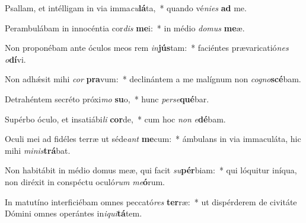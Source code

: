 \item Psallam, et intélligam in via imma\textit{cu}\textbf{lá}ta,~* quando vé\textit{ni}\textit{es} \textbf{ad} me.
\item Perambulábam in innocéntia cor\textit{dis} \textbf{me}i:~* in médio \textit{do}\textit{mus} \textbf{me}æ.
\item Non proponébam ante óculos meos rem \textit{in}\textbf{jús}tam:~* faciéntes prævaricatió\textit{nes} \textit{o}\textbf{dí}vi.
\item Non adhǽsit mihi \textit{cor} \textbf{pra}vum:~* declinántem a me malígnum non \textit{co}\textit{gno}\textbf{scé}bam.
\item Detrahéntem secréto próxi\textit{mo} \textbf{su}o,~* hunc \textit{per}\textit{se}\textbf{qué}bar.
\item Supérbo óculo, et insatiábi\textit{li} \textbf{cor}de,~* cum hoc \textit{non} \textit{e}\textbf{dé}bam.
\item Oculi mei ad fidéles terræ ut séde\textit{ant} \textbf{me}cum:~* ámbulans in via immaculáta, hic mihi \textit{mi}\textit{nis}\textbf{trá}bat.
\item Non habitábit in médio domus meæ, qui facit \textit{su}\textbf{pér}biam:~* qui lóquitur iníqua, non diréxit in conspéctu oculó\textit{rum} \textit{me}\textbf{ó}rum.
\item In matutíno interficiébam omnes peccató\textit{res} \textbf{ter}ræ:~* ut dispérderem de civitáte Dómini omnes operántes in\textit{i}\textit{qui}\textbf{tá}tem.
